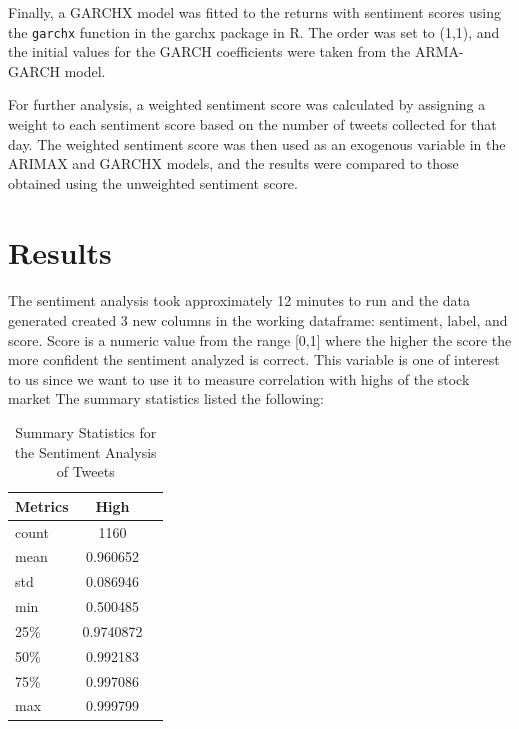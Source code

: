 \documentclass[12pt, letterpaper, titlepage]{article}
\begin{document}
Finally, a GARCHX model was fitted to the returns with sentiment scores using the \texttt{garchx} function in the garchx package in R. The order was set to (1,1), and the initial values for the GARCH coefficients were taken from the ARMA-GARCH model.

For further analysis, a weighted sentiment score was calculated by assigning a weight to each sentiment score based on the number of tweets collected for that day. The weighted sentiment score was then used as an exogenous variable in the ARIMAX and GARCHX models, and the results were compared to those obtained using the unweighted sentiment score.

\label{sec: results}
\section{Results}
\paragraph{}
The sentiment analysis took approximately 12 minutes to run and the data generated created 3 new columns in the working dataframe: sentiment, label, and score. Score is a numeric value from the range [0,1] where the higher the score the more confident the sentiment analyzed is correct. This variable is one of interest to us since we want to use it to measure correlation with highs of the stock market The summary statistics listed the following:

\begin{table}[!hb]
  \begin{center}
    \caption{Summary Statistics for the Sentiment Analysis of Tweets}
    \label{tab:table2}
    \begin{tabular}{l|c|r} %
      \textbf{Metrics} & \textbf{High} \\
      \hline
      count & 1160 \\
      mean & 0.960652 \\
      std & 0.086946 \\
      min & 0.500485 \\
      25\% & 0.9740872 \\
      50\% & 0.992183 \\
      75\% & 0.997086 \\
      max & 0.999799 \\
    \end{tabular}
  \end{center}
\end{table}
\end{document}
